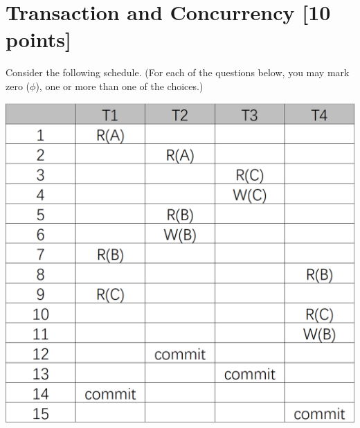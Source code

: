 \documentclass[10pt]{article}
\begin{document}
\newpage
\section{Transaction and Concurrency \textbf{[10 points]}}
Consider the following schedule. (For each of the questions below, you may mark zero ($\phi$), one
or more than one of the choices.)
\begin{center}
	\includegraphics[scale=0.35]{transaction.png}
\end{center}
\end{document}

